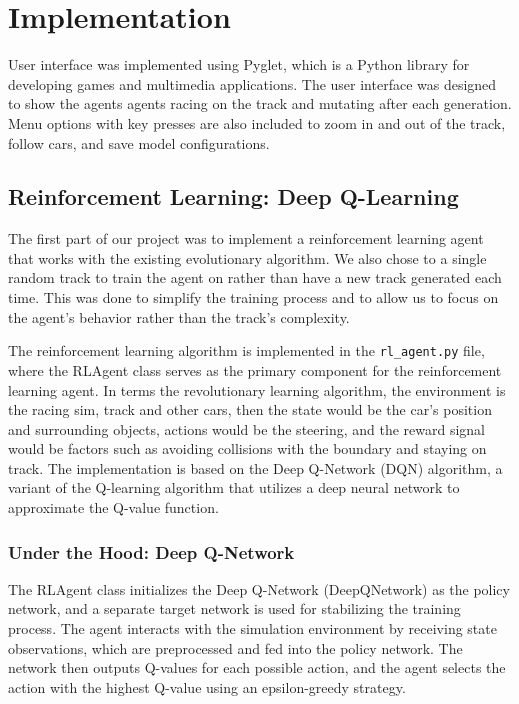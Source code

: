 \documentclass[12pt]{article}
\begin{document}
\section{Implementation}

User interface was implemented using Pyglet, which is a Python library for
developing games and multimedia applications. The user interface was designed to 
show the agents agents racing on the track and mutating after each generation. 
Menu options with key presses are also included to zoom in and out of the track, 
follow cars, and save model configurations.

\subsection{Reinforcement Learning: Deep Q-Learning}

The first part of our project was to implement a reinforcement learning agent 
that works with the existing evolutionary algorithm. We also chose to a single 
random track to train the agent on rather than have a new track generated each
time. This was done to simplify the training process and to allow us to focus on
the agent's behavior rather than the track's complexity.

The reinforcement learning algorithm is implemented in the \texttt{rl\_agent.py} 
file, where the RLAgent class serves as the primary component for the 
reinforcement learning agent. In terms the revolutionary learning algorithm, 
the environment is the racing sim, track and other cars, then the state would 
be the car's position and surrounding objects, actions would be the steering, 
and the reward signal would be factors such as avoiding collisions with the 
boundary and staying on track. The implementation is based on the Deep Q-Network 
(DQN) algorithm, a variant of the Q-learning algorithm that utilizes a deep 
neural network to approximate the Q-value function.

\subsubsection{Under the Hood: Deep Q-Network}
The RLAgent class initializes the Deep Q-Network (DeepQNetwork) as the policy 
network, and a separate target network is used for stabilizing the training 
process. The agent interacts with the simulation environment by receiving 
state observations, which are preprocessed and fed into the policy network. 
The network then outputs Q-values for each possible action, and the agent 
selects the action with the highest Q-value using an epsilon-greedy strategy.
\end{document}
